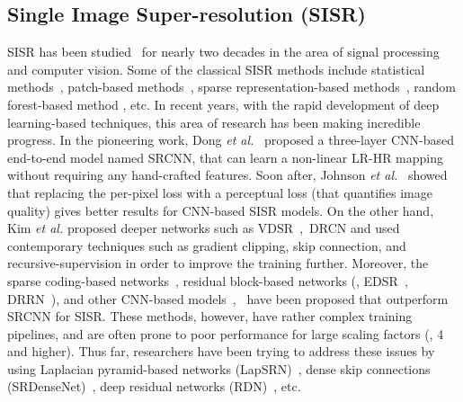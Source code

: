 \documentclass[10pt,twocolumn,letterpaper]{article}
\begin{document}
\subsection{Single Image Super-resolution (SISR)}
SISR has been studied~\cite{freeman2002example, chang2004super, melville2005super} for nearly two decades in the area of signal processing and computer vision. Some of the classical SISR methods include statistical methods~\cite{sun2008image,kim2010single,protter2008generalizing}, patch-based methods~\cite{glasner2009super,yang2012coupled, huang2015single}, sparse representation-based methods~\cite{yang2010image}, random forest-based method \cite{schulter2015fast}, etc. 
In recent years, with the rapid development of deep learning-based techniques, this area of research has been making incredible progress. In the pioneering work, Dong \textit{et al.}~\cite{dong2015image} proposed a three-layer CNN-based end-to-end model named SRCNN, that can learn a non-linear LR-HR mapping without requiring any hand-crafted features. Soon after, Johnson \textit{et al.}~\cite{johnson2016perceptual} showed that replacing the per-pixel loss with a perceptual loss (that quantifies image quality) gives better results for CNN-based SISR models. 
On the other hand, Kim \textit{et al.} proposed deeper networks such as VDSR~\cite{kim2016accurate},~DRCN \cite{kim2016deeply} and used contemporary techniques such as gradient clipping, skip connection, and recursive-supervision in order to improve the training further. 
Moreover, the sparse coding-based networks~\cite{liu2016robust}, residual block-based networks (\eg, EDSR~\cite{lim2017enhanced}, DRRN~\cite{tai2017image}), and other CNN-based models~\cite{shi2016real},~\cite{dong2016accelerating} have been proposed that outperform SRCNN for SISR. 
These methods, however, have rather complex training pipelines, and are often prone to poor performance for large scaling factors (\ie, 4 and higher). Thus far, researchers have been trying to address these issues by using Laplacian pyramid-based networks (LapSRN)~\cite{lai2017deep}, dense skip connections (SRDenseNet)~\cite{tong2017image}, deep residual networks (RDN)~\cite{zhang2018residual}, etc. 
\end{document}
